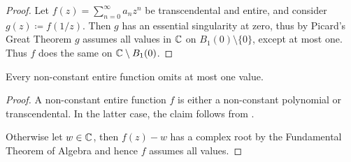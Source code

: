 \begin{proof}
    Let $f(z) = \sum_{n=0}^\infty a_n z^n$ be transcendental and entire, and consider $g(z) \coloneqq f(1 / z)$. Then $g$ has an essential singularity at zero, thus by Picard's Great Theorem $g$ assumes all values in $\mathbb{C}$ on $B_1(0) \setminus \{ 0 \}$, except at most one. Thus $f$ does the same on $\mathbb{C} \setminus B_1(0)$.
\end{proof}

\begin{corollary} \label{thm:picards-little-theorem}
    Every non-constant entire function omits at most one value.
\end{corollary}

\begin{proof}
    A non-constant entire function $f$ is either a non-constant polynomial or transcendental. In the latter case, the claim follows from .
    
    Otherwise let $w \in \mathbb{C}$, then $f(z) - w$ has a complex root by the Fundamental Theorem of Algebra and hence $f$ assumes all values.
\end{proof}